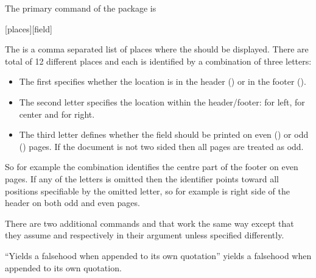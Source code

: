 The primary command of the package is
\begin{lscommand}
  [places][field]
\end{lscommand}
The  is a comma separated list of places where the  should be displayed. There are total of 12 different places and each is identified by a
combination of three letters:
\begin{itemize}
  \item The first specifies whether the location is in the header () or in the
        footer ().
  \item The second letter specifies the location within the header\slash{}footer:  for left,  for center and
         for right.
  \item The third letter defines whether the field should be printed on even
        () or odd () pages. If the document is not two sided then
        all pages are treated as odd.
\end{itemize}
So for example the combination  identifies the centre part of the
footer on even pages. If any of the letters is omitted then the identifier
points toward all positions specifiable by the omitted letter, so for example
 is right side of the header on both odd and even pages.

There are two additional commands  and  that work
the same way except that they assume  and  respectively
in their  argument unless specified differently.
\begin{example}[standalone, paperheight=3.5cm]
\geometry{includefoot, includehead, headsep=.5em, footskip=1em} %
\sloppy %
\usepackage{csquotes} %
\usepackage{fancyhdr}%
\pagestyle{fancy}%


\noindent %
\enquote{Yields a falsehood when
appended to its own quotation}
yields a falsehood when appended
to its own quotation.
\end{example}

